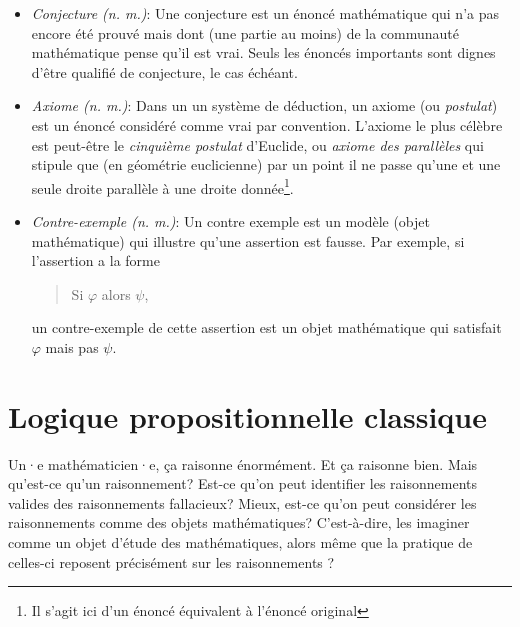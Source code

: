 \documentclass[french,course,oneside,theoremnosection]{lecture}
\begin{document}
\begin{itemize}
\item \emph{Conjecture (n. m.)}: Une conjecture est un énoncé mathématique qui n'a pas encore été prouvé mais dont (une partie au moins) de la communauté mathématique pense qu'il est vrai. Seuls les énoncés importants sont dignes d'être qualifié de conjecture, le cas échéant.


\item \emph{Axiome (n. m.)}: Dans un un système de déduction, un axiome (ou \emph{postulat}) est un énoncé considéré comme vrai par convention. L'axiome le plus célèbre est peut-être le \emph{cinquième postulat} d'Euclide, ou \emph{axiome des parallèles} qui stipule que (en géométrie euclicienne) par un point il ne passe qu'une et une seule droite parallèle à une droite donnée\footnote{Il s'agit ici d'un énoncé équivalent à l'énoncé original}.



\item \emph{Contre-exemple (n. m.)}: Un contre exemple est un modèle (objet mathématique) qui illustre qu'une assertion est fausse. Par exemple, si l'assertion a la forme 
\begin{quotation}
Si $\varphi$ alors $\psi$,
\end{quotation}
un contre-exemple de cette assertion est un objet mathématique qui satisfait $\varphi$ mais pas $\psi$.

\end{itemize}



\section{Logique propositionnelle classique}

Un·e mathématicien·e, ça raisonne énormément. Et ça raisonne bien. Mais qu'est-ce qu'un raisonnement? Est-ce qu'on peut identifier les raisonnements valides des raisonnements fallacieux? Mieux, est-ce qu'on peut considérer les raisonnements comme des objets mathématiques? C'est-à-dire, les imaginer comme un objet d'étude des mathématiques, alors même que la pratique de celles-ci reposent précisément sur les raisonnements ? 
\end{document}
